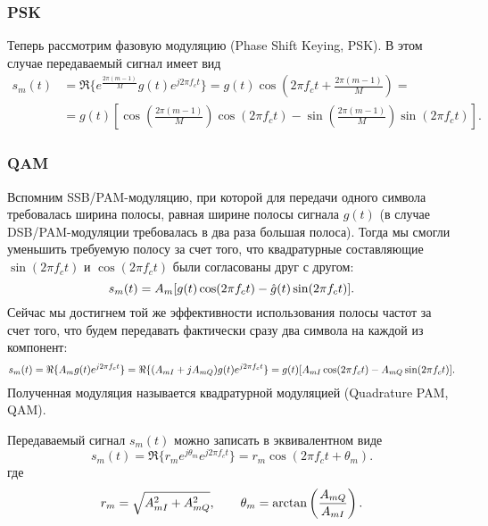 \documentclass{book}
\numberwithin{theorem}{chapter}
\numberwithin{statement}{chapter}
\numberwithin{lemma}{chapter}
\theoremstyle{definition}
\numberwithin{task}{chapter}
\theoremstyle{remark}
\numberwithin{example}{chapter}
\theoremstyle{definition}
\numberwithin{definition}{chapter}
\theoremstyle{remark}
\theoremstyle{remark}
\numberwithin{lyrics}{section}
\begin{document}
\subsubsection{PSK}
Теперь рассмотрим фазовую модуляцию (Phase Shift Keying, PSK). В этом случае передаваемый сигнал имеет вид
\begin{equation}
\begin{aligned}
\label{eq:phy:mod:psk:signal}
s_m(t) &= \Re\{e^{\frac{2\pi(m - 1)}{M}} g(t) e^{j2\pi f_c t}\} = g(t) \cos(2\pi f_c t + \frac{2\pi(m - 1)}{M}) = \\ &= g(t) \left[\cos\left(\frac{2\pi(m - 1)}{M}\right) \cos(2\pi f_c t) - \sin\left(\frac{2\pi(m - 1)}{M}\right) \sin(2\pi f_c t) \right].
\end{aligned}
\end{equation}

\subsubsection{QAM}
\label{sec:modulation:QAM}
Вспомним SSB/PAM-модуляцию, при которой для передачи одного символа требовалась ширина полосы, равная ширине полосы сигнала $g(t)$ (в случае DSB/PAM-модуляции требовалась в два раза большая полоса). Тогда мы смогли уменьшить требуемую полосу за счет того, что квадратурные составляющие $\sin(2\pi f_c t)$ и $\cos(2\pi f_c t)$ были согласованы друг с другом:
\begin{equation}
\notag
s_m(t) = A_m [g(t) \cos(2\pi f_c t) - \hat{g}(t)\sin(2\pi f_c t)].
\end{equation}
Сейчас мы достигнем той же эффективности использования полосы частот за счет того, что будем передавать фактически сразу два символа на каждой из компонент:
\begin{equation}
\label{eq:phy:mod:qam:signal}
s_m(t) = \Re\{A_m g(t) e^{j2\pi f_c t}\} = 
\Re\{(A_{mI} + jA_{mQ}) g(t) e^{j2\pi f_c t}\} = 
g(t)[A_{mI} \cos(2\pi f_c t) - A_{mQ} \sin(2\pi f_c t)].
\end{equation}
Полученная модуляция называется квадратурной модуляцией (Quadrature PAM, QAM). 

Передаваемый сигнал $s_m(t)$ можно записать в эквивалентном виде
\begin{equation}
\label{eq:phy:mod:qam:equaivalen_signal}
s_m(t) = \Re\{r_m e^{j \theta_m} e^{j2\pi f_c t}\} = r_m \cos(2 \pi f_c t + \theta_m).
\end{equation}
где
\begin{equation}
r_m = \sqrt{A_{mI}^2 + A_{mQ}^2}, \qquad \theta_m = \arctan \left(\frac{A_{mQ}}{A_{mI}} \right).
\end{equation}
\end{document}
